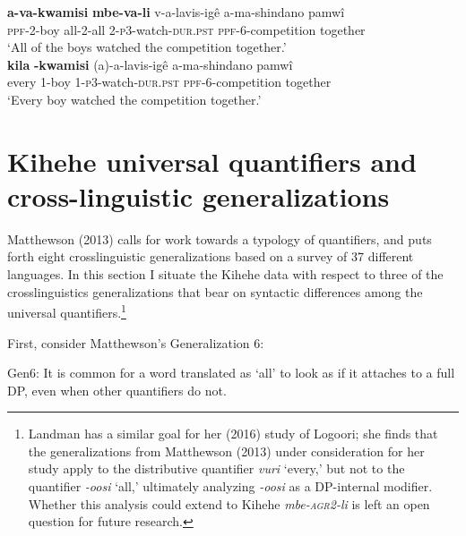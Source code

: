 \documentclass[output=paper,modfonts,nonflat]{langsci/langscibook}
\begin{document}
\begin{exe}

\ex  \label{ex:kaspercushman:competition} \begin{xlist}

\ex 
\gll \textbf{a-va-kwamisi} \textbf{mbe-va-li} v-a-lavis-ig\^e a-ma-shindano pamw\^i \\
\textsc{ppf}-2-boy all-2-all 2-\textsc{p3}-watch-\textsc{dur.pst} \textsc{ppf}-6-competition together\\
\glt `All of the boys watched the competition together.'\\



\ex \label{ex:kaspercushman:everytogether} 
\gll * \textbf{kila} \textbf{-kwamisi} (a)-a-lavis-ig\^e a-ma-shindano pamw\^i \\
{} every 1-boy 1-\textsc{p3}-watch-\textsc{dur.pst} \textsc{ppf}-6-competition together \\
\glt `Every boy watched the competition together.'

\end{xlist}
\end{exe}

 

\section{Kihehe universal quantifiers and cross-linguistic generalizations}  \label{ex:kaspercushman:type}

Matthewson (2013) calls for work towards a typology of quantifiers, and puts forth eight crosslinguistic generalizations based on a survey of 37 different languages. In this section I situate the Kihehe data with respect to three of the crosslinguistics generalizations that bear on syntactic differences among the universal quantifiers.\footnote{Landman has a similar goal for her (2016) study of Logoori; she finds that the generalizations from Matthewson (2013) under consideration for her study apply to the distributive quantifier \textit{vuri} `every,' but not to the quantifier \textit{-oosi} `all,' ultimately analyzing \textit{-oosi} as a DP-internal modifier. Whether this analysis could extend to Kihehe \textit{mbe-\textsc{agr2}-li} is left an open question for future research.}  



First, consider Matthewson's Generalization 6:

\begin{exe}

\ex Gen6: It is common for a word translated as `all' to look as if it attaches to a full DP, even when other quantifiers do not. \cite[p. 35]{matthewson13} \\
\end{exe}
\end{document}
